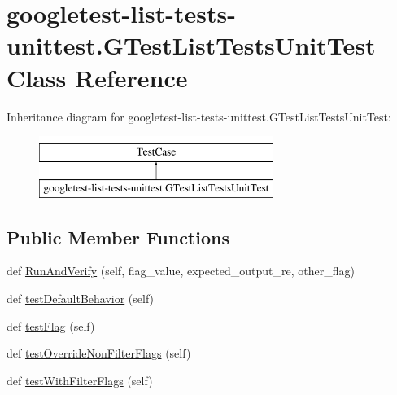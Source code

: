 \hypertarget{classgoogletest-list-tests-unittest_1_1GTestListTestsUnitTest}{}\section{googletest-\/list-\/tests-\/unittest.G\+Test\+List\+Tests\+Unit\+Test Class Reference}
\label{classgoogletest-list-tests-unittest_1_1GTestListTestsUnitTest}
Inheritance diagram for googletest-\/list-\/tests-\/unittest.G\+Test\+List\+Tests\+Unit\+Test\+:\begin{figure}[H]
\begin{center}
\leavevmode
\includegraphics[height=2.000000cm]{classgoogletest-list-tests-unittest_1_1GTestListTestsUnitTest}
\end{center}
\end{figure}
\subsection*{Public Member Functions}
\begin{DoxyCompactItemize}
\item 
def \mbox{\hyperlink{classgoogletest-list-tests-unittest_1_1GTestListTestsUnitTest_a6630e10404717e8edd3df1439fb0d81c}{Run\+And\+Verify}} (self, flag\+\_\+value, expected\+\_\+output\+\_\+re, other\+\_\+flag)
\item 
def \mbox{\hyperlink{classgoogletest-list-tests-unittest_1_1GTestListTestsUnitTest_aacba8c9eaef1b649ba40ede17218d0f1}{test\+Default\+Behavior}} (self)
\item 
def \mbox{\hyperlink{classgoogletest-list-tests-unittest_1_1GTestListTestsUnitTest_a8f5b423963d862456348a8903ccdfade}{test\+Flag}} (self)
\item 
def \mbox{\hyperlink{classgoogletest-list-tests-unittest_1_1GTestListTestsUnitTest_a961396c3c2b8d22f6491beb5348594aa}{test\+Override\+Non\+Filter\+Flags}} (self)
\item 
def \mbox{\hyperlink{classgoogletest-list-tests-unittest_1_1GTestListTestsUnitTest_adb60d2295fee8ed4af2a5ee1a32e5778}{test\+With\+Filter\+Flags}} (self)
\end{DoxyCompactItemize}


